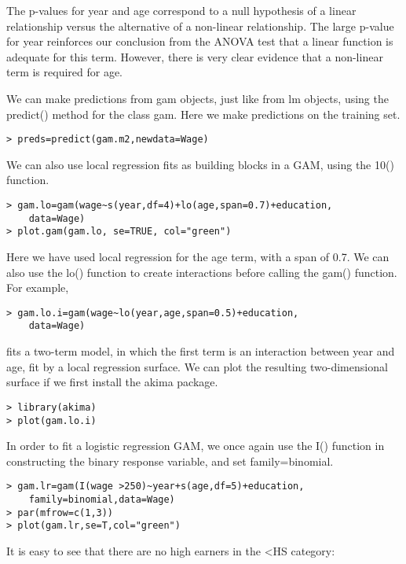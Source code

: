 \documentclass[10pt]{article}
\begin{document}
The p-values for year and age correspond to a null hypothesis of a linear relationship versus the alternative of a non-linear relationship. The large p-value for year reinforces our conclusion from the ANOVA test that a linear function is adequate for this term. However, there is very clear evidence that a non-linear term is required for age.

We can make predictions from gam objects, just like from lm objects, using the predict() method for the class gam. Here we make predictions on the training set.

\begin{verbatim}
> preds=predict(gam.m2,newdata=Wage)
\end{verbatim}

We can also use local regression fits as building blocks in a GAM, using the 10() function.

\begin{verbatim}
> gam.lo=gam(wage~s(year,df=4)+lo(age,span=0.7)+education,
    data=Wage)
> plot.gam(gam.lo, se=TRUE, col="green")
\end{verbatim}

Here we have used local regression for the age term, with a span of 0.7. We can also use the lo() function to create interactions before calling the gam() function. For example,

\begin{verbatim}
> gam.lo.i=gam(wage~lo(year,age,span=0.5)+education,
    data=Wage)
\end{verbatim}

fits a two-term model, in which the first term is an interaction between year and age, fit by a local regression surface. We can plot the resulting two-dimensional surface if we first install the akima package.

\begin{verbatim}
> library(akima)
> plot(gam.lo.i)
\end{verbatim}

In order to fit a logistic regression GAM, we once again use the I() function in constructing the binary response variable, and set family=binomial.

\begin{verbatim}
> gam.lr=gam(I(wage >250)~year+s(age,df=5)+education,
    family=binomial,data=Wage)
> par(mfrow=c(1,3))
> plot(gam.lr,se=T,col="green")
\end{verbatim}

It is easy to see that there are no high earners in the <HS category:
\end{document}
